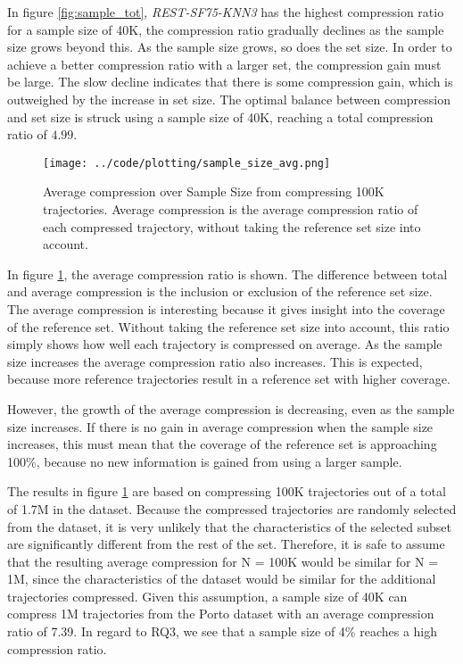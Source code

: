 In figure \ref{fig:sample_tot}, \textit{REST-SF75-KNN3} has the highest compression ratio for a sample size of 40K, the compression ratio gradually declines as the sample size grows beyond this. As the sample size grows, so does the set size. In order to achieve a better compression ratio with a larger set, the compression gain must be large. The slow decline indicates that there is some compression gain, which is outweighed by the increase in set size. The optimal balance between compression and set size is struck using a sample size of 40K, reaching a total compression ratio of $4.99$.

\begin{figure}[h]
    \begin{minipage}{0.99\linewidth}
        \centering
        \texttt{[image: ../code/plotting/sample\_size\_avg.png]}
        \caption{Average compression over Sample Size from compressing 100K trajectories. Average compression is the average compression ratio of each compressed trajectory, without taking the reference set size into account.}
        \label{fig:sample_avg}
    \end{minipage}
\end{figure}

In figure \ref{fig:sample_avg}, the average compression ratio is shown. The difference between total and average compression is the inclusion or exclusion of the reference set size. The average compression is interesting because it gives insight into the coverage of the reference set. Without taking the reference set size into account, this ratio simply shows how well each trajectory is compressed on average. As the sample size increases the average compression ratio also increases. This is expected, because more reference trajectories result in a reference set with higher coverage.

However, the growth of the average compression is decreasing, even as the sample size increases. If there is no gain in average compression when the sample size increases, this must mean that the coverage of the reference set is approaching 100\%, because no new information is gained from using a larger sample.

The results in figure \ref{fig:sample_avg} are based on compressing 100K trajectories out of a total of 1.7M in the dataset. Because the compressed trajectories are randomly selected from the dataset, it is very unlikely that the characteristics of the selected subset are significantly different from the rest of the set. Therefore, it is safe to assume that the resulting average compression for N = 100K would be similar for N = 1M, since the characteristics of the dataset would be similar for the additional trajectories compressed. Given this assumption, a sample size of 40K can compress 1M trajectories from the Porto dataset with an average compression ratio of 7.39. In regard to RQ3, we see that a sample size of 4\% reaches a high compression ratio.

